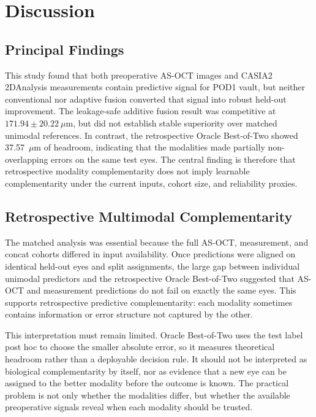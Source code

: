 \documentclass[10pt,twocolumn]{article}
\begin{document}
\section{Discussion}

\subsection{Principal Findings}

This study found that both preoperative AS-OCT images and CASIA2 2DAnalysis measurements contain predictive signal for POD1 vault, but neither conventional nor adaptive fusion converted that signal into robust held-out improvement. The leakage-safe additive fusion result was competitive at $171.94 \pm 20.22~\mu$m, but did not establish stable superiority over matched unimodal references. In contrast, the retrospective Oracle Best-of-Two showed 37.57~$\mu$m of headroom, indicating that the modalities made partially non-overlapping errors on the same test eyes. The central finding is therefore that retrospective modality complementarity does not imply learnable complementarity under the current inputs, cohort size, and reliability proxies.

\subsection{Retrospective Multimodal Complementarity}

The matched analysis was essential because the full AS-OCT, measurement, and concat cohorts differed in input availability. Once predictions were aligned on identical held-out eyes and split assignments, the large gap between individual unimodal predictors and the retrospective Oracle Best-of-Two suggested that AS-OCT and measurement predictions do not fail on exactly the same eyes. This supports retrospective predictive complementarity: each modality sometimes contains information or error structure not captured by the other.

This interpretation must remain limited. Oracle Best-of-Two uses the test label post hoc to choose the smaller absolute error, so it measures theoretical headroom rather than a deployable decision rule. It should not be interpreted as biological complementarity by itself, nor as evidence that a new eye can be assigned to the better modality before the outcome is known. The practical problem is not only whether the modalities differ, but whether the available preoperative signals reveal when each modality should be trusted.
\end{document}

